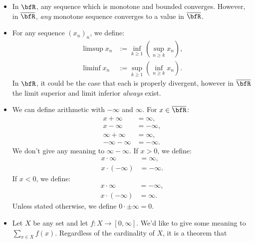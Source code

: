 \begin{itemize}
        \item In $\bfR$, any sequence which is monotone and bounded converges. However, in $\overline{\bfR}$, \textit{any} monotone sequence converges to a value in $\overline{\bfR}$. 
        \item For any sequence $(x_n)_n$, we define:
            \begin{equation*}
            \begin{split}
                \limsup x_n &:= \inf_{k \geq 1} \left( \sup_{n \geq k}x_n \right), \\
                \liminf x_n &:= \sup_{k \geq 1} \left( \inf_{n \geq k}x_n \right).
            \end{split}
            \end{equation*}
        In $\bfR$, it could be the case that each is properly divergent, however in $\overline{\bfR}$ the limit superior and limit inferior \textit{always} exist.
        \item We can define arithmetic with $-\infty$ and $\infty$. For $x \in \overline{\bfR}$:
            \begin{equation*}
            \begin{split}
                x+ \infty &= \infty, \\
                x - \infty &= -\infty, \\
                \infty + \infty &= \infty, \\
                -\infty - \infty &= -\infty.
            \end{split}
            \end{equation*}
        We don't give any meaning to $\infty-\infty$. If $x > 0$, we define:
            \begin{equation*}
            \begin{split}
                x \cdot \infty &= \infty, \\
                x \cdot ( -\infty) &= - \infty.
            \end{split}
            \end{equation*}
        If $x < 0$, we define:
            \begin{equation*}
            \begin{split}
                x \cdot \infty & = -\infty, \\
                x \cdot (-\infty) & = \infty.
            \end{split}
            \end{equation*}
        Unless stated otherwise, we define $0 \cdot \pm \infty = 0$.

        \item Let $X$ be any set and let $f:X \rightarrow [0,\infty]$. We'd like to give some meaning to $\sum_{x \in X}f(x)$. Regardless of the cardinality of $X$, it is a theorem that 
    \end{itemize}

